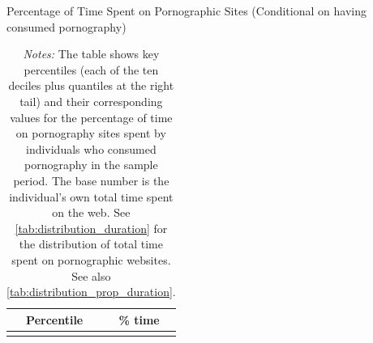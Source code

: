 \documentclass[12pt,twoside]{article}
\begin{document}
\begin{table}[ht] \centering \small \setlength\tabcolsep{10 pt}
	\caption{Percentage of Time Spent on Pornographic Sites (Conditional on having consumed pornography)}
	\label{tab:distribution_prop_duration_mar}
	\begin{adjustbox}{max width=\textwidth}
		\begin{tabular}{cr}
			\toprule
			\multicolumn{1}{c}{\textbf{Percentile}}&\multicolumn{1}{c}{\textbf{\% time}}\\
			\midrule
			\\
			\bottomrule
		\end{tabular}
	\end{adjustbox}
	\caption*{\footnotesize \emph{Notes:} The table shows key percentiles (each of the ten deciles plus quantiles at the right tail) and their corresponding values for the percentage of time on pornography sites spent by individuals who consumed pornography in the sample period. The base number is the individual's own total time spent on the web. See \cref{tab:distribution_duration} for the distribution of total time spent on pornographic websites.
    See also \cref{tab:distribution_prop_duration}.
 }
\end{table}
\end{document}

